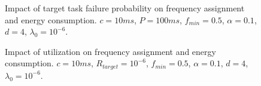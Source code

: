 \begin{figure}[!t]
	\begin{center}
	\end{center}
	\caption{Impact of target task failure probability on frequency assignment and energy consumption. $c=10ms$, $P=100ms$, $f_{min}=0.5$, $\alpha=0.1$, $d=4$, $\lambda_0=10^{-6}$.}
	\label{fig:failure_impact}
\end{figure}

\begin{figure}[!t]
	\begin{center}
	\end{center}
	\caption{Impact of utilization on frequency assignment and energy consumption. $c=10ms$, $R_{target}=10^{-6}$, $f_{min}=0.5$, $\alpha=0.1$, $d=4$, $\lambda_0=10^{-6}$.}
	\label{fig:utilization_impact}
\end{figure}

